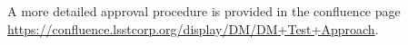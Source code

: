 A more detailed approval procedure is provided in the confluence page \url{https://confluence.lsstcorp.org/display/DM/DM+Test+Approach}.










